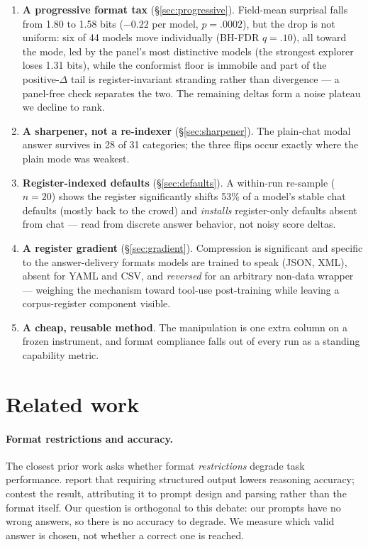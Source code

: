 \documentclass[11pt]{article}
\begin{document}
\begin{enumerate}
\item \textbf{A progressive format tax} (\S\ref{sec:progressive}). Field-mean surprisal falls
from 1.80 to 1.58 bits ($-0.22$ per model, $p=.0002$), but the drop is not uniform: six of
44 models move individually (BH-FDR $q=.10$), all toward the mode, led by the panel's most
distinctive models (the strongest explorer loses 1.31 bits),
while the conformist floor is immobile and part of the positive-$\Delta$ tail is
register-invariant stranding rather than divergence --- a panel-free check separates the two.
The remaining deltas form a noise plateau we decline to rank.
\item \textbf{A sharpener, not a re-indexer} (\S\ref{sec:sharpener}). The plain-chat modal
answer survives in 28 of 31 categories; the three flips occur exactly where the plain mode was
weakest.
\item \textbf{Register-indexed defaults} (\S\ref{sec:defaults}). A within-run re-sample
($n{=}20$) shows the register significantly shifts 53\% of a model's stable chat defaults (mostly
back to the crowd) and \emph{installs} register-only defaults absent from chat --- read from
discrete answer behavior, not noisy score deltas.
\item \textbf{A register gradient} (\S\ref{sec:gradient}). Compression is significant and
specific to the answer-delivery formats models are trained to speak (JSON, XML), absent for
YAML and CSV, and \emph{reversed} for an arbitrary non-data wrapper --- weighing the mechanism
toward tool-use post-training while leaving a corpus-register component visible.
\item \textbf{A cheap, reusable method}. The manipulation is one extra column on a frozen
instrument, and format compliance falls out of every run as a standing capability metric.
\end{enumerate}

\section{Related work}
\label{sec:related}

\paragraph{Format restrictions and accuracy.}
The closest prior work asks whether format \emph{restrictions} degrade task performance.
\citet{tam2024speakfreely} report that requiring structured output lowers reasoning accuracy;
\citet{kurt2024saywhatyoumean} contest the result, attributing it to prompt design and parsing
rather than the format itself. Our question is orthogonal to this debate: our prompts have no
wrong answers, so there is no accuracy to degrade. We measure which valid answer is chosen, not
whether a correct one is reached.
\end{document}
